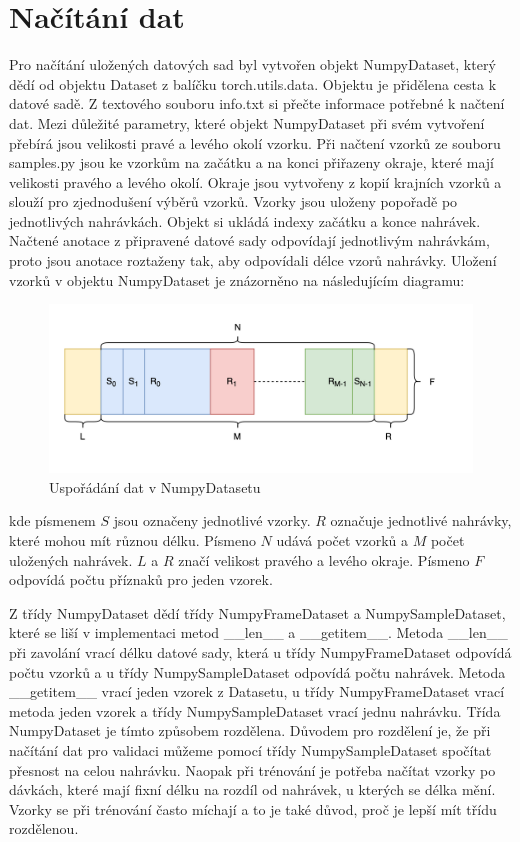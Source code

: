 \documentclass[FM,BP]{tulthesis}
\begin{document}
\section{Načítání dat}
Pro načítání uložených datových sad byl vytvořen objekt NumpyDataset, který dědí od objektu Dataset z balíčku torch.utils.data. Objektu je přidělena cesta k datové sadě. Z textového souboru info.txt si přečte informace potřebné k načtení dat. Mezi důležité parametry, které objekt NumpyDataset při svém vytvoření přebírá jsou velikosti pravé a levého okolí vzorku. Při načtení vzorků ze souboru samples.py jsou ke vzorkům na začátku a na konci přiřazeny okraje, které mají velikosti pravého a levého okolí. Okraje jsou vytvořeny z kopií krajních vzorků a slouží pro zjednodušení výběrů vzorků. Vzorky jsou uloženy popořadě po jednotlivých nahrávkách. Objekt si ukládá indexy začátku a konce nahrávek. Načtené anotace z připravené datové sady odpovídají jednotlivým nahrávkám, proto jsou anotace roztaženy tak, aby odpovídali délce vzorů nahrávky. Uložení vzorků v objektu NumpyDataset je znázorněno na následujícím diagramu:

\begin{figure}[htbp]
\centerline{\includegraphics[scale=.15]{dataset_arrangement.png}}
\caption{Uspořádání dat v NumpyDatasetu}
\label{fig}
\end{figure}

kde písmenem $ S $ jsou označeny jednotlivé vzorky. $ R $ označuje jednotlivé nahrávky, které mohou mít různou délku. Písmeno $ N $ udává počet vzorků a $ M $ počet uložených nahrávek. $ L $ a $ R $ značí velikost pravého a levého okraje. Písmeno $ F $ odpovídá počtu příznaků pro jeden vzorek.

Z třídy NumpyDataset dědí třídy NumpyFrameDataset a NumpySampleDataset, které se liší v implementaci metod \_\_len\_\_ a \_\_getitem\_\_. Metoda \_\_len\_\_ při zavolání vrací délku datové sady, která u třídy NumpyFrameDataset odpovídá počtu vzorků a u třídy NumpySampleDataset odpovídá počtu nahrávek. Metoda \_\_getitem\_\_ vrací jeden vzorek z Datasetu, u třídy NumpyFrameDataset vrací metoda jeden vzorek a třídy NumpySampleDataset vrací jednu nahrávku. Třída NumpyDataset je tímto způsobem rozdělena. Důvodem pro rozdělení je, že při načítání dat pro validaci můžeme pomocí třídy NumpySampleDataset spočítat přesnost na celou nahrávku. Naopak při trénování je potřeba načítat vzorky po dávkách, které mají fixní délku na rozdíl od nahrávek, u kterých se délka mění. Vzorky se při trénování často míchají a to je také důvod, proč je lepší mít třídu rozdělenou.
\end{document}
